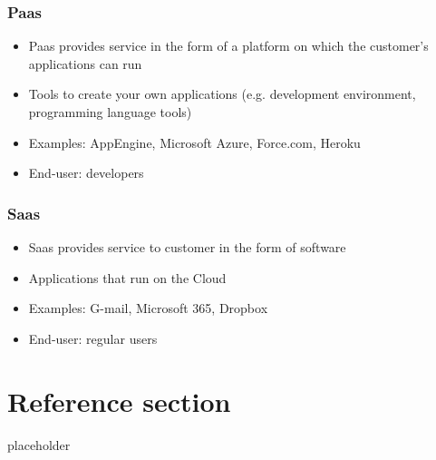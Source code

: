 \documentclass{article}
\begin{document}
\subsubsection{Paas}
\begin{itemize}
	\item Paas provides service in the form of a platform on which the customer’s applications can run
	\item Tools to create your own applications (e.g. development environment, programming language tools)
	\item Examples: AppEngine, Microsoft Azure, Force.com, Heroku
	\item End-user: developers
\end{itemize}

\subsubsection{Saas}
\begin{itemize}
	\item Saas provides service to customer in the form of software
	\item Applications that run on the Cloud
	\item Examples: G-mail, Microsoft 365, Dropbox
	\item End-user: regular users
\end{itemize}

\pagebreak
\section*{Reference section} \label{sec:reference}
\begin{description}
	\item[placeholder] \hfill \\
\end{description}
\end{document}
